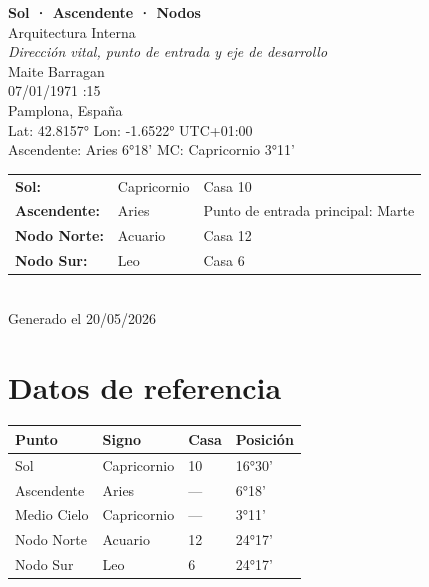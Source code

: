 \documentclass[11pt,a4paper]{article}
\begin{document}
\begin{titlepage}
  \centering
  \vspace*{1.5cm}
  {\Huge\bfseries\color{azulai} Sol · Ascendente · Nodos}\\[0.5cm]
  {\large\color{grisai} Arquitectura Interna}\\[0.3cm]
  {\small\itshape\color{grisai} Dirección vital, punto de entrada y eje de desarrollo}\\[2cm]
  {\huge\color{doradoai} Maite Barragan}\\[1.5cm]
  {\Large 07/01/1971 :15}\\[0.3cm]
  {\Large Pamplona, España}\\[0.3cm]
  {\normalsize Lat: 42.8157° \quad Lon: -1.6522° \quad UTC+01:00}\\[0.3cm]
  {\normalsize Ascendente: Aries 6°18' \quad
    MC: Capricornio 3°11'}\\[2cm]
  \begin{tabular}{lll}
    \textbf{Sol:} & Capricornio & Casa 10 \\
    \textbf{Ascendente:} & Aries & Punto de entrada principal: Marte \\
    \textbf{Nodo Norte:} & Acuario & Casa 12 \\
    \textbf{Nodo Sur:}   & Leo & Casa 6 \\
  \end{tabular}\\[2cm]
  \vfill
  {\small Generado el 20/05/2026}
\end{titlepage}

\tableofcontents
\newpage

\section{Datos de referencia}

\begin{center}
\begin{tabular}{llll}
  \toprule
  \textbf{Punto} & \textbf{Signo} & \textbf{Casa} & \textbf{Posición} \\
  \midrule
  Sol           & Capricornio & 10 & 16°30' \\
  Ascendente    & Aries & --- & 6°18' \\
  Medio Cielo   & Capricornio & --- & 3°11' \\
  Nodo Norte    & Acuario & 12 & 24°17' \\
  Nodo Sur      & Leo & 6 & 24°17' \\
  \bottomrule
\end{tabular}
\end{center}
\end{document}
